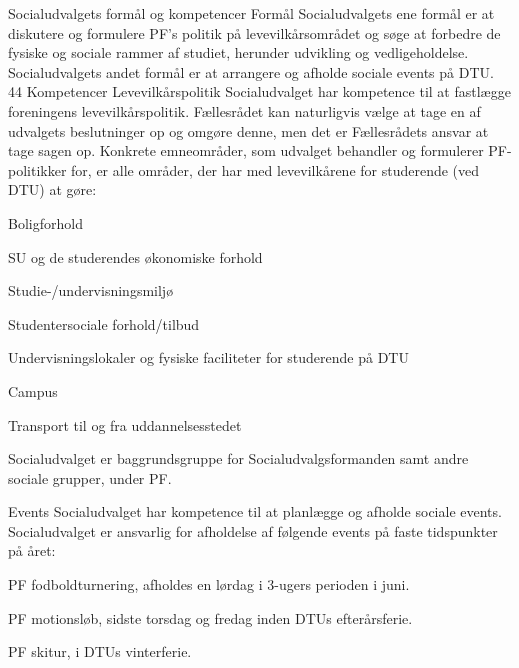 Socialudvalgets formål og kompetencer
Formål
Socialudvalgets ene formål er at diskutere og formulere PF’s politik på levevilkårsområdet og søge at forbedre de
fysiske og sociale rammer af studiet, herunder udvikling og
vedligeholdelse.
Socialudvalgets andet formål er at arrangere og afholde sociale events på DTU.
44
Kompetencer
Levevilkårspolitik
Socialudvalget har kompetence til at fastlægge foreningens levevilkårspolitik.
Fællesrådet kan naturligvis vælge at tage en af udvalgets beslutninger op og omgøre
denne, men det er Fællesrådets ansvar at tage sagen op.
Konkrete emneområder, som udvalget behandler og formulerer PF-politikker for, er alle
områder, der har med levevilkårene for studerende (ved DTU) at gøre:
\begin{list}{•}
\item Boligforhold
\item SU og de studerendes økonomiske forhold
\item Studie-/undervisningsmiljø
	\begin{list}{•}
	\item Studentersociale forhold/tilbud
	\item Undervisningslokaler og fysiske faciliteter for studerende på DTU
	\item Campus
	\item Transport til og fra uddannelsesstedet
	\end{list}
\end{list}

Socialudvalget er baggrundsgruppe for Socialudvalgsformanden samt andre sociale
grupper, under PF.


Events
Socialudvalget har kompetence til at planlægge og afholde sociale events.
Socialudvalget er ansvarlig for afholdelse af følgende events på faste tidspunkter på året:
\begin{list}{•}
\item PF fodboldturnering, afholdes en lørdag i 3-ugers perioden i juni.
\item PF motionsløb, sidste torsdag og fredag inden DTUs efterårsferie.
\item PF skitur, i DTUs vinterferie.
\end{list}


